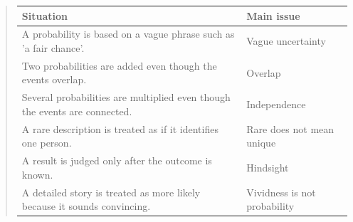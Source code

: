 \documentclass[
  letterpaper,
  DIV=11,
  numbers=noendperiod]{scrreprt}
\begin{document}
\begin{tcolorbox}
\begin{quote}
\begin{table}
\fontsize{12.0pt}{14.0pt}\selectfont
\begin{tabular*}{\linewidth}{@{\extracolsep{\fill}}ll}
\toprule
Situation & Main issue \\ 
\midrule\addlinespace[2.5pt]
A probability is based on a vague phrase such as 'a fair chance'. & Vague uncertainty \\ 
Two probabilities are added even though the events overlap. & Overlap \\ 
Several probabilities are multiplied even though the events are connected. & Independence \\ 
A rare description is treated as if it identifies one person. & Rare does not mean unique \\ 
A result is judged only after the outcome is known. & Hindsight \\ 
A detailed story is treated as more likely because it sounds convincing. & Vividness is not probability \\ 
\bottomrule
\end{tabular*}
\end{table}
\end{quote}

\end{tcolorbox}
\end{document}
